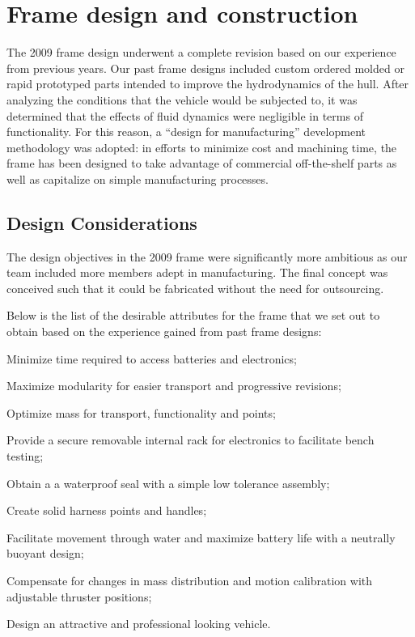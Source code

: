\section{Frame design and construction}
The 2009 frame design underwent a complete revision based on our
experience from previous years.  Our past frame designs included
custom ordered molded or rapid prototyped parts intended to improve
the hydrodynamics of the hull.  After analyzing the conditions that
the vehicle would be subjected to, it was determined that the effects
of fluid dynamics were negligible in terms of functionality.  For this
reason, a ``design for manufacturing'' development methodology was
adopted: in efforts to minimize cost and machining time, the frame has been
designed to take advantage of commercial off-the-shelf parts as
well as capitalize on simple manufacturing processes.

\subsection{Design Considerations}
\label{fobjectives}
The design objectives in the 2009 frame were significantly more
ambitious as our team included more members adept in manufacturing.
The final concept was conceived such that it could be fabricated
without the need for outsourcing.

Below is the list of the desirable attributes for the frame that we set out to
obtain based on the experience gained from past frame designs:
\begin{packed_enum}
\item Minimize time required to access batteries and electronics;
\item Maximize modularity for easier transport and progressive revisions;
\item Optimize mass for transport, functionality and points;
\item Provide a secure removable internal rack for electronics to facilitate bench testing;
\item Obtain a a waterproof seal with a simple low tolerance assembly;
\item Create solid harness points and handles;
\item Facilitate movement through water and maximize battery life with
  a neutrally buoyant design;
\item Compensate for changes in mass distribution and motion
  calibration with adjustable thruster positions;
\item Design an attractive and professional looking vehicle.
\end{packed_enum}

